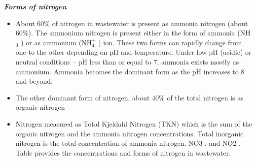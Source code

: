 	\textbf{\textit{Forms of nitrogen}}
					      \begin{itemize}
					      	\item About 60\% of nitrogen in wastewater is present as ammonia nitrogen (about 60\%).  The ammonium nitrogen is present either in the form of ammonia (NH$_3$ ) or as ammonium (NH$_4^+$ ) ion.   These two forms can rapidly change from one to the other depending on pH and temperature.  Under low pH (acidic) or neutral conditions – pH less than or equal to 7, ammonia exists mostly as ammonium.  Ammonia becomes the dominant form as the pH increases to 8 and beyond.
					      	\item The other dominant form of nitrogen, about 40\% of the total nitrogen is as organic nitrogen
					      	\item Nitrogen measured as Total Kjeldahl Nitrogen (TKN) which is the sum of the organic nitrogen and the ammonia nitrogen concentrations.  Total inorganic nitrogen is the total concentration of ammonia nitrogen, NO3-, and NO2-.   Table provides the concentrations and forms of nitrogen in wastewater.
					      \end{itemize}
					      \setlength{\arrayrulewidth}{0.7mm}
					      \setlength{\tabcolsep}{8 pt}
					      \renewcommand{\arraystretch}{0.8}
